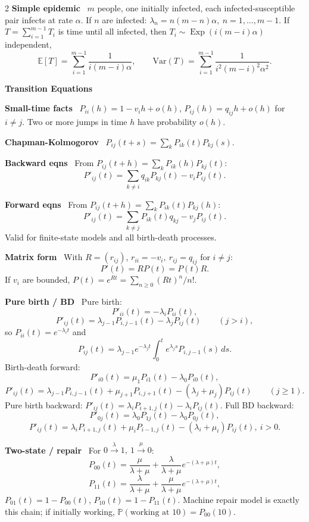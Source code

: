 \documentclass[10pt,fleqn]{article}
\newcommand{\PP}{\mathbb{P}}
\newcommand{\E}{\mathbb{E}}
\newcommand{\Var}{\mathrm{Var}}
\newcommand{\shead}[1]{\vspace{0.05ex}\textbf{\scriptsize #1}\par}
\newcommand{\topic}[1]{\textbf{#1}\ }
\DeclareMathOperator{\Exp}{Exp}
\begin{document}
\begin{multicols*}{2}
\topic{Simple epidemic} \(m\) people, one initially infected, each infected-susceptible pair infects at rate \(\alpha\). If \(n\) are infected: \(\lambda_n=n(m-n)\alpha,\ n=1,\dots,m-1\). If \(T=\sum_{i=1}^{m-1}T_i\) is time until all infected, then \(T_i\sim\Exp(i(m-i)\alpha)\) independent,
\[
\E[T]=\sum_{i=1}^{m-1}\frac{1}{i(m-i)\alpha},\qquad
\Var(T)=\sum_{i=1}^{m-1}\frac{1}{i^2(m-i)^2\alpha^2}.
\]

\shead{Transition Equations}
\topic{Small-time facts} \(P_{ii}(h)=1-v_ih+o(h)\), \(P_{ij}(h)=q_{ij}h+o(h)\) for \(i\ne j\). Two or more jumps in time \(h\) have probability \(o(h)\).

\topic{Chapman-Kolmogorov} \(P_{ij}(t+s)=\sum_k P_{ik}(t)P_{kj}(s)\).

\topic{Backward eqns} From \(P_{ij}(t+h)=\sum_k P_{ik}(h)P_{kj}(t)\):
\[
P'_{ij}(t)=\sum_{k\ne i}q_{ik}P_{kj}(t)-v_iP_{ij}(t).
\]

\topic{Forward eqns} From \(P_{ij}(t+h)=\sum_k P_{ik}(t)P_{kj}(h)\):
\[
P'_{ij}(t)=\sum_{k\ne j}P_{ik}(t)q_{kj}-v_jP_{ij}(t).
\]
Valid for finite-state models and all birth-death processes.

\topic{Matrix form} With \(R=(r_{ij})\), \(r_{ii}=-v_i,\ r_{ij}=q_{ij}\) for \(i\ne j\):
\[
P'(t)=RP(t)=P(t)R.
\]
If \(v_i\) are bounded, \(P(t)=e^{Rt}=\sum_{n\ge0}(Rt)^n/n!\).

\topic{Pure birth / BD} Pure birth:
\[
P'_{ii}(t)=-\lambda_iP_{ii}(t),
\]
\[
P'_{ij}(t)=\lambda_{j-1}P_{i,j-1}(t)-\lambda_jP_{ij}(t)\qquad (j>i),
\]
so \(P_{ii}(t)=e^{-\lambda_i t}\) and
\[
P_{ij}(t)=\lambda_{j-1}e^{-\lambda_j t}\int_0^t e^{\lambda_j s}P_{i,j-1}(s)\,ds.
\]
Birth-death forward:
\[
P'_{i0}(t)=\mu_1P_{i1}(t)-\lambda_0P_{i0}(t),
\]
\[
P'_{ij}(t)=\lambda_{j-1}P_{i,j-1}(t)+\mu_{j+1}P_{i,j+1}(t)-(\lambda_j+\mu_j)P_{ij}(t)\qquad (j\ge1).
\]
Pure birth backward: \(P'_{ij}(t)=\lambda_iP_{i+1,j}(t)-\lambda_iP_{ij}(t)\). Full BD backward:
\[
P'_{0j}(t)=\lambda_0P_{1j}(t)-\lambda_0P_{0j}(t),
\]
\[
P'_{ij}(t)=\lambda_iP_{i+1,j}(t)+\mu_iP_{i-1,j}(t)-(\lambda_i+\mu_i)P_{ij}(t),\ i>0.
\]

\topic{Two-state / repair} For \(0\xrightarrow{\lambda}1,\ 1\xrightarrow{\mu}0\):
\[
P_{00}(t)=\frac{\mu}{\lambda+\mu}+\frac{\lambda}{\lambda+\mu}e^{-(\lambda+\mu)t},
\]
\[
P_{11}(t)=\frac{\lambda}{\lambda+\mu}+\frac{\mu}{\lambda+\mu}e^{-(\lambda+\mu)t},
\]
\(P_{01}(t)=1-P_{00}(t)\), \(P_{10}(t)=1-P_{11}(t)\). Machine repair model is exactly this chain; if initially working, \(\PP(\text{working at }10)=P_{00}(10)\).


\end{multicols*}
\end{document}
